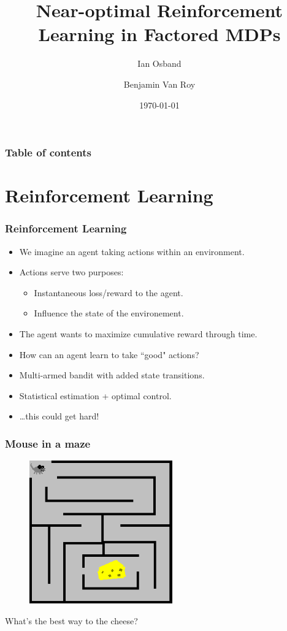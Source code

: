 \documentclass{beamer}
\title{Near-optimal Reinforcement Learning in Factored MDPs}
\author{Ian Osband \and Benjamin Van Roy}
\institute{Mangement Science and Engineering \\
Stanford University \\
iosband@stanford.edu}
\date{\today}
\newlength{\wideitemsep}
\let\olditem\item
\renewcommand{\item}{\setlength{\itemsep}{\wideitemsep}\olditem}
\begin{document}
\maketitle

\begin{frame}
\frametitle{Table of contents}
\tableofcontents
\end{frame}

\section{Reinforcement Learning}

\begin{frame}
\frametitle{Reinforcement Learning}

\begin{itemize}
	\item We imagine an agent taking actions within an environment.
	\item Actions serve two purposes:
	\begin{itemize}
		\item Instantaneous loss/reward to the agent.
		\item Influence the state of the environement.
	\end{itemize}
	\item The agent wants to maximize cumulative reward through time.
	\item How can an agent learn to take ``good" actions?
	\pause
	\vspace{0.5in}
	\item Multi-armed bandit with added state transitions.
	\item Statistical estimation + optimal control.
	\pause
	\item \dots this could get hard!
\end{itemize}
\end{frame}

\begin{frame}
\frametitle{Mouse in a maze}
\begin{figure}
\includegraphics[width=0.55\textwidth]{./media/mazeCheese}
\end{figure}
\centering
What's the best way to the cheese?
\end{frame}
\end{document}
